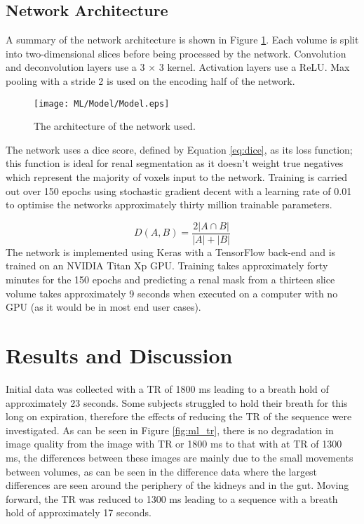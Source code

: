 \subsection{Network Architecture}

A summary of the network architecture is shown in Figure \ref{fig:ml_network}. Each volume is split into two-dimensional slices before being processed by the network. Convolution and deconvolution layers use a 3 $\times$ 3 kernel. Activation layers use a \ac{ReLU}. Max pooling with a stride 2 is used on the encoding half of the network.

\begin{figure}[h]
	\centering
	\texttt{[image: ML/Model/Model.eps]}
	\caption{The architecture of the network used.}
	\label{fig:ml_network}	
\end{figure}

The network uses a dice score, defined by Equation \eqref{eq:dice}, as its loss function; this function is ideal for renal segmentation as it doesn't weight true negatives which represent the majority of voxels input to the network. Training is carried out over 150 epochs using stochastic gradient decent with a learning rate of 0.01 to optimise the networks approximately thirty million trainable parameters.

\begin{equation}
D\left(A, B\right) = \frac{2\left| A \cap B \right|}{\left|A\right|+\left|B\right|}
\label{eq:dice}
\end{equation}
The network is implemented using Keras \cite{noauthor_keras_2019} with a TensorFlow \cite{noauthor_tensorflow_2019} back-end and is trained on an NVIDIA Titan Xp \ac{GPU}. Training takes approximately forty minutes for the 150 epochs and predicting a renal mask from a thirteen slice volume takes approximately 9 seconds when executed on a computer with no \ac{GPU} (as it would be in most end user cases).

\newpage
\section{Results and Discussion}

Initial data was collected with a \ac{TR} of 1800 ms leading to a breath hold of approximately 23 seconds. Some subjects struggled to hold their breath for this long on expiration, therefore the effects of reducing the \ac{TR} of the sequence were investigated. As can be seen in Figure \ref{fig:ml_tr}, there is no degradation in image quality from the image with \ac{TR} or 1800 ms to that with at \ac{TR} of 1300 ms, the differences between these images are mainly due to the small movements between volumes, as can be seen in the difference data where the largest differences are seen around the periphery of the kidneys and in the gut. Moving forward, the \ac{TR} was reduced to 1300 ms leading to a sequence with a breath hold of approximately 17 seconds.

